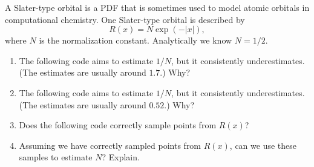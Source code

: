 \begin{exercise} %
    A Slater-type orbital is a PDF that is sometimes used to model atomic orbitals in computational chemistry.  One Slater-type orbital is described by
    \[
        R(x) = N\exp(-|x|),
    \]
    where $N$ is the normalization constant.  Analytically we know $N = 1/2$.

    \begin{figure}[h!]
        \centering
    \end{figure}

    \begin{enumerate}[label=(\alph*)]

        \item The following code aims to estimate $1/N$, but it consistently underestimates.  (The estimates are usually around $1.7$.)  Why?
        

        \item The following code aims to estimate $1/N$, but it
        consistently underestimates.  (The estimates are usually around
        $0.52$.)  Why?
        


        \item Does the following code correctly sample points from $R(x)$?
        

        \item Assuming we have correctly sampled points from $R(x)$,
        can we use these samples to estimate $N$?  Explain.

    \end{enumerate}
\end{exercise}

